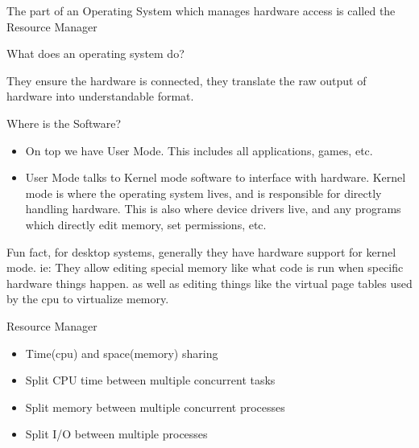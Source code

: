 \documentclass{report}
\begin{document}
\begin{description}
\begin{mdframed}
            The part of an Operating System which manages hardware
            access is called the Resource Manager
        \end{mdframed}
    \item What does an operating system do? 
        \begin{mdframed}
            They ensure the hardware is connected,
            they translate the raw output of hardware
            into understandable format.
        \end{mdframed}
    \item Where is the Software?
        \begin{mdframed}
            \begin{itemize}
                \item On top we have User Mode. This includes all applications,
                    games, etc.
                \item User Mode talks to Kernel mode software to interface with hardware.
                    Kernel mode is where the operating system lives, and is responsible
                    for directly handling hardware. This is also where device drivers
                    live, and any programs which directly edit memory, set permissions,
                    etc.
            \end{itemize}
        \end{mdframed}
        \begin{center}
            \begin{mdframed}
                Fun fact, for desktop systems,
                generally they have hardware support for
                kernel mode. ie: They allow editing special memory
                like what code is run when specific hardware things happen.
                as well as editing things like the virtual page tables used by the
                cpu to virtualize memory.
            \end{mdframed}
        \end{center}
    \item Resource Manager
        \begin{itemize}
            \item Time(cpu) and space(memory) sharing
            \item Split CPU time between multiple concurrent tasks
            \item Split memory between multiple concurrent processes
            \item Split I/O between multiple processes

\end{itemize}
\end{description}
\end{document}
